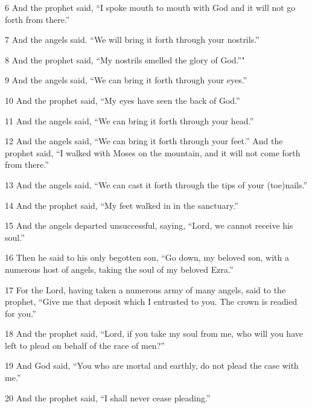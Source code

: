 \par 6 And the prophet said, “I spoke mouth to mouth with God and it will not go forth from there.”

\par 7 And the angels said. “We will bring it forth through your nostrils.”

\par 8 And the prophet said, “My nostrils smelled the glory of God.”"

\par 9 And the angels said, “We can bring it forth through your eyes.” 

\par 10 And the prophet said, “My eyes have seen the back of God.”

\par 11 And the angels said, “We can bring it forth through your head.”

\par 12 And the angels said, “We can bring it forth through your feet.” And the prophet said, “I walked with Moses on the mountain, and it will not come forth from there.”

\par 13 And the angels said, “We can cast it forth through the tips of your (toe)nails.”

\par 14 And the prophet said, “My feet walked in in the sanctuary.” 

\par 15 And the angels departed unsuccessful, saying, “Lord, we cannot receive his soul.”

\par 16 Then he said to his only begotten son, “Go down, my beloved son, with a numerous host of angels, taking the soul of my beloved Ezra.”

\par 17 For the Lord, having taken a numerous army of many angels, said to the prophet, “Give me that deposit which I entrusted to you. The crown is readied for you.”

\par 18 And the prophet said, “Lord, if you take my soul from me, who will you have left to plead on behalf of the race of men?”

\par 19 And God said, “You who are mortal and earthly, do not plead the case with me.”

\par 20 And the prophet said, “I shall never cease pleading.”


